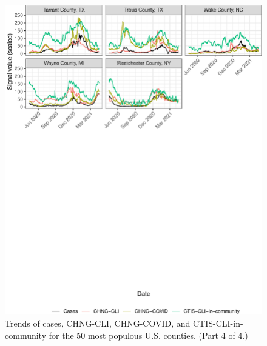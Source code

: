 \documentclass[9pt,twoside]{pnas-new}
\begin{document}
\begin{figure}

{\centering \includegraphics[width=\textwidth]{fig/county-trend-grids-4-1} 

}

\caption{Trends of cases, CHNG-CLI, CHNG-COVID, and CTIS-CLI-in-community for the 50 most populous U.S. counties. (Part 4 of 4.)}\label{fig:county-trend-grids-4}
\end{figure}

\clearpage
\end{document}
